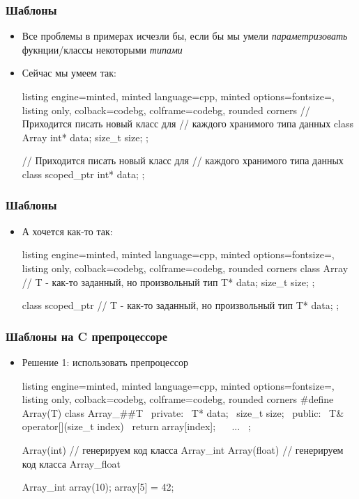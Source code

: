 \documentclass[10pt]{beamer}
\begin{document}
\begin{frame}[fragile]
\frametitle{Шаблоны}
\begin{itemize}
\item Все проблемы в примерах исчезли бы, если бы мы умели \textit{параметризовать} фукнции/классы некоторыми \textit{типами}
\pause
\item Сейчас мы умеем так:
\begin{tcblisting}{listing engine=minted, minted language=cpp, minted options={fontsize=\scriptsize}, listing only, colback=codebg, colframe=codebg, rounded corners}
// Приходится писать новый класс для
// каждого хранимого типа данных
class Array {
  int* data;
  size_t size;
};

// Приходится писать новый класс для
// каждого хранимого типа данных
class scoped_ptr {
  int* data;
};
\end{tcblisting}
\end{itemize}
\end{frame}

\begin{frame}[fragile]
\frametitle{Шаблоны}
\begin{itemize}
\item А хочется как-то так:
\begin{tcblisting}{listing engine=minted, minted language=cpp, minted options={fontsize=\scriptsize}, listing only, colback=codebg, colframe=codebg, rounded corners}
class Array {
  // T - как-то заданный, но произвольный тип
  T* data;
  size_t size;
};

class scoped_ptr {
  // T - как-то заданный, но произвольный тип
  T* data;
};
\end{tcblisting}
\end{itemize}
\end{frame}

\begin{frame}[fragile]
\frametitle{Шаблоны на C препроцессоре}
\begin{itemize}
\item Решение 1: использовать препроцессор
\begin{tcblisting}{listing engine=minted, minted language=cpp, minted options={fontsize=\scriptsize}, listing only, colback=codebg, colframe=codebg, rounded corners}
#define Array(T) class Array_##T { \
private: \
  T* data; \
  size_t size; \
public: \
  T& operator[](size_t index) { \
    return array[index]; \
  } \
  ... \
};

Array(int) // генерируем код класса Array_int
Array(float) // генерируем код класса Array_float

Array_int array(10);
array[5] = 42;
\end{tcblisting}
\end{itemize}
\end{frame}
\end{document}
